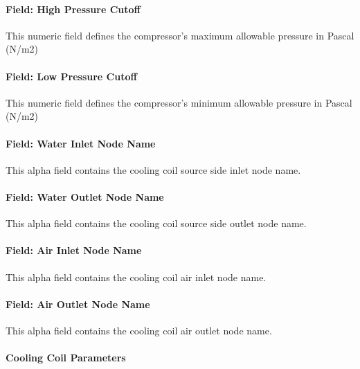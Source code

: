 \paragraph{Field: High Pressure Cutoff}\label{field-high-pressure-cutoff}

This numeric field defines the compressor's maximum allowable pressure in Pascal (N/m2)

\paragraph{Field: Low Pressure Cutoff}\label{field-low-pressure-cutoff}

This numeric field defines the compressor's minimum allowable pressure in Pascal (N/m2)

\paragraph{Field: Water Inlet Node Name}\label{field-water-inlet-node-name-5-000}

This alpha field contains the cooling coil source side inlet node name.

\paragraph{Field: Water Outlet Node Name}\label{field-water-outlet-node-name-5-000}

This alpha field contains the cooling coil source side outlet node name.

\paragraph{Field: Air Inlet Node Name}\label{field-air-inlet-node-name-16}

This alpha field contains the cooling coil air inlet node name.

\paragraph{Field: Air Outlet Node Name}\label{field-air-outlet-node-name-16}

This alpha field contains the cooling coil air outlet node name.

\paragraph{Cooling Coil Parameters}\label{cooling-coil-parameters}

